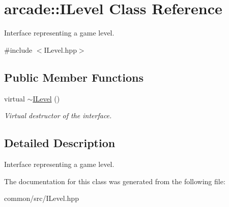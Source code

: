 \hypertarget{classarcade_1_1ILevel}{}\section{arcade\+:\+:I\+Level Class Reference}
\label{classarcade_1_1ILevel}


Interface representing a game level.  




{\ttfamily \#include $<$I\+Level.\+hpp$>$}

\subsection*{Public Member Functions}
\begin{DoxyCompactItemize}
\item 
\mbox{\label{classarcade_1_1ILevel_adfb4fa7604148e972ca51490ce9e5fa6}} 
virtual \hyperlink{classarcade_1_1ILevel_adfb4fa7604148e972ca51490ce9e5fa6}{$\sim$\+I\+Level} ()
\begin{DoxyCompactList}\small\item\em Virtual destructor of the interface. \end{DoxyCompactList}\end{DoxyCompactItemize}


\subsection{Detailed Description}
Interface representing a game level. 

The documentation for this class was generated from the following file\+:\begin{DoxyCompactItemize}
\item 
common/src/I\+Level.\+hpp\end{DoxyCompactItemize}
